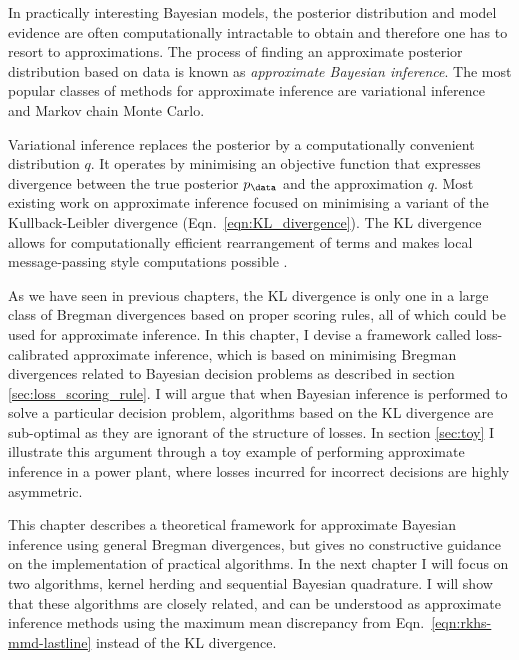 In practically interesting Bayesian models, the posterior distribution and model evidence are often computationally intractable to obtain and therefore one has to resort to approximations. The process of finding an approximate posterior distribution based on data is known as \emph{approximate Bayesian inference}. The most popular classes of methods for approximate inference are variational inference and Markov chain Monte Carlo.

Variational inference replaces the posterior by a computationally convenient distribution $q$. It operates by minimising an objective function that expresses divergence between the true posterior $p_\data$ and the approximation $q$. Most existing work on approximate inference focused on minimising a variant of the Kullback-Leibler divergence (Eqn.\ \eqref{eqn:KL_divergence}). The KL divergence allows for computationally efficient rearrangement of terms and makes local message-passing style computations possible \citep{Minka2001,Winn2006}.

As we have seen in previous chapters, the KL divergence is only one in a large class of Bregman divergences based on proper scoring rules, all of which could be used for approximate inference. In this chapter, I devise a framework called loss-calibrated approximate inference, which is based on minimising Bregman divergences related to Bayesian decision problems as described in section \ref{sec:loss_scoring_rule}. I will argue that when Bayesian inference is performed to solve a particular decision problem, algorithms based on the KL divergence are sub-optimal as they are ignorant of the structure of losses. In section \ref{sec:toy} I illustrate this argument through a toy example of performing approximate inference in a power plant, where losses incurred for incorrect decisions are highly asymmetric.

This chapter describes a theoretical framework for approximate Bayesian inference using general Bregman divergences, but gives no constructive guidance on the implementation of practical algorithms. In the next chapter I will focus on two algorithms, kernel herding and sequential Bayesian quadrature. I will show that these algorithms are closely related, and can be understood as approximate inference methods using the maximum mean discrepancy from Eqn.\ \eqref{eqn:rkhs-mmd-lastline} instead of the KL divergence.


